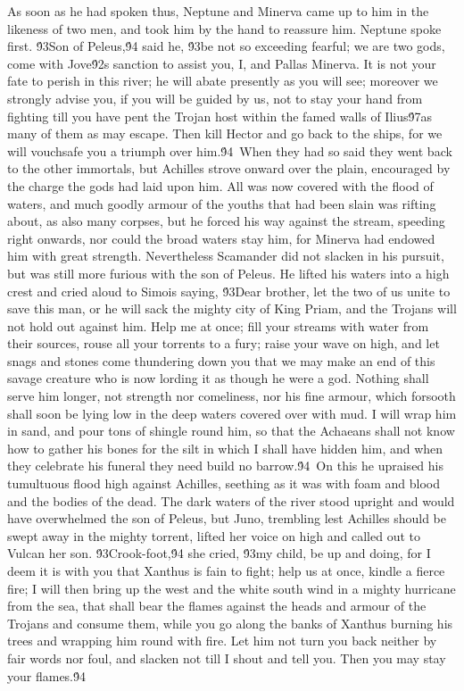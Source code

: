 {As soon as he had spoken thus, Neptune and Minerva came up to him in the likeness of two men, and took him by the hand to reassure him. Neptune spoke first. \'93Son of Peleus,\'94 said he, \'93be not so exceeding fearful; we are two gods, come with Jove\'92s sanction to assist you, I, and Pallas Minerva. It is not your fate to perish in this river; he will abate presently as you will see; moreover we strongly advise you, if you will be guided by us, not to stay your hand from fighting till you have pent the Trojan host within the famed walls of Ilius\'97as many of them as may escape. Then kill Hector and go back to the ships, for we will vouchsafe you a triumph over him.\'94\
When they had so said they went back to the other immortals, but Achilles strove onward over the plain, encouraged by the charge the gods had laid upon him. All was now covered with the flood of waters, and much goodly armour of the youths that had been slain was rifting about, as also many corpses, but he forced his way against the stream, speeding right onwards, nor could the broad waters stay him, for Minerva had endowed him with great strength. Nevertheless Scamander did not slacken in his pursuit, but was still more furious with the son of Peleus. He lifted his waters into a high crest and cried aloud to Simois saying, \'93Dear brother, let the two of us unite to save this man, or he will sack the mighty city of King Priam, and the Trojans will not hold out against him. Help me at once; fill your streams with water from their sources, rouse all your torrents to a fury; raise your wave on high, and let snags and stones come thundering down you that we may make an end of this savage creature who is now lording it as though he were a god. Nothing shall serve him longer, not strength nor comeliness, nor his fine armour, which forsooth shall soon be lying low in the deep waters covered over with mud. I will wrap him in sand, and pour tons of shingle round him, so that the Achaeans shall not know how to gather his bones for the silt in which I shall have hidden him, and when they celebrate his funeral they need build no barrow.\'94\
On this he upraised his tumultuous flood high against Achilles, seething as it was with foam and blood and the bodies of the dead. The dark waters of the river stood upright and would have overwhelmed the son of Peleus, but Juno, trembling lest Achilles should be swept away in the mighty torrent, lifted her voice on high and called out to Vulcan her son. \'93Crook-foot,\'94 she cried, \'93my child, be up and doing, for I deem it is with you that Xanthus is fain to fight; help us at once, kindle a fierce fire; I will then bring up the west and the white south wind in a mighty hurricane from the sea, that shall bear the flames against the heads and armour of the Trojans and consume them, while you go along the banks of Xanthus burning his trees and wrapping him round with fire. Let him not turn you back neither by fair words nor foul, and slacken not till I shout and tell you. Then you may stay your flames.\'94\
}
